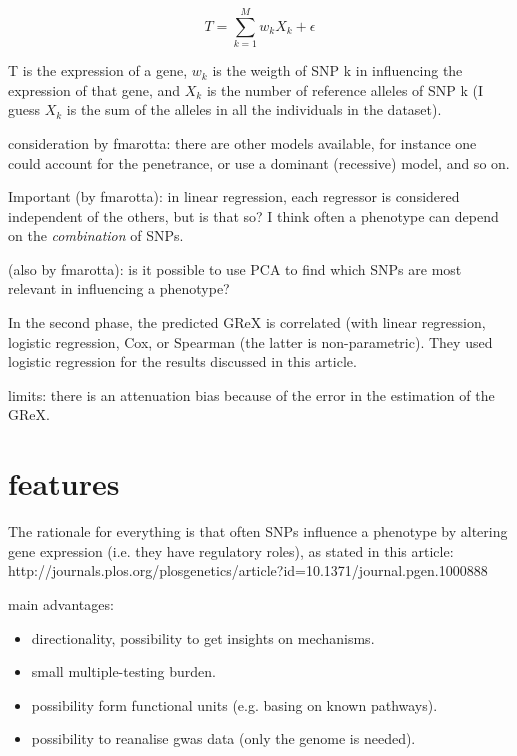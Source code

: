 \documentclass[../main.tex]{subfiles}
\begin{document}
\begin{equation}
	T = \sum_{k=1}^{M}{w_k X_k + \epsilon}
\end{equation}

T is the expression of a gene, $w_k$ is the weigth of SNP k in influencing the
expression of that gene, and $X_k$ is the number of reference alleles of SNP k
(I guess $X_k$ is the sum of the alleles in all the individuals in the
dataset).

consideration by fmarotta: there are other models available, for instance one
could account for the penetrance, or use a dominant (recessive) model, and so
on.

Important (by fmarotta): in linear regression, each regressor is considered
independent of the others, but is that so? I think often a phenotype can depend
on the \textit{combination} of SNPs.

(also by fmarotta): is it possible to use PCA to find which SNPs are most
relevant in influencing a phenotype?

In the second phase, the predicted GReX is correlated (with linear regression,
logistic regression, Cox, or Spearman (the latter is non-parametric). They used
logistic regression for the results discussed in this article.

limits: there is an attenuation bias because of the error in the estimation of
the GReX.

\section{features}

The rationale for everything is that often SNPs influence a phenotype by
altering gene expression (i.e. they have regulatory roles), as stated in this
article:
http://journals.plos.org/plosgenetics/article?id=10.1371/journal.pgen.1000888

main advantages:

\begin{itemize}
\item directionality, possibility to get insights on mechanisms.
\item small multiple-testing burden.
\item possibility form functional units (e.g. basing on known pathways).
\item possibility to reanalise gwas data (only the genome is needed).
\end{itemize}

\end{document}
